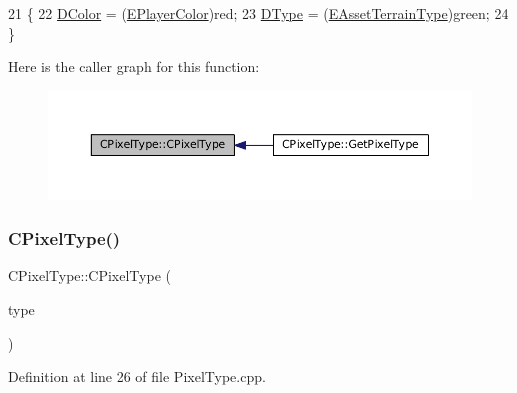 \begin{DoxyCode}
21                                                   \{
22     \hyperlink{classCPixelType_a474243cf748aee94cfa207659e940b6c}{DColor} = (\hyperlink{GameDataTypes_8h_aafb0ca75933357ff28a6d7efbdd7602f}{EPlayerColor})red;
23     \hyperlink{classCPixelType_aca37f042b510a349e0d3209c73ae51c5}{DType} = (\hyperlink{classCPixelType_af06457fd1c2ff34c67ce670e633a10b0}{EAssetTerrainType})green;
24 \}
\end{DoxyCode}
Here is the caller graph for this function\+:
\nopagebreak
\begin{figure}[H]
\begin{center}
\leavevmode
\includegraphics[width=350pt]{classCPixelType_a393381dca7114d6279bcee1e5f280e4b_icgraph}
\end{center}
\end{figure}
\hypertarget{classCPixelType_a8adc1d375b7d644025dcca8ff0849c76}{}\label{classCPixelType_a8adc1d375b7d644025dcca8ff0849c76} 
\subsubsection{\texorpdfstring{C\+Pixel\+Type()}{CPixelType()}\hspace{0.1cm}{\footnotesize\ttfamily [2/4]}}
{\footnotesize\ttfamily C\+Pixel\+Type\+::\+C\+Pixel\+Type (\begin{DoxyParamCaption}\item[{\hyperlink{classCTerrainMap_aff2ab991e237269941416dd79d8871d4}{C\+Terrain\+Map\+::\+E\+Tile\+Type}}]{type }\end{DoxyParamCaption})}



Definition at line 26 of file Pixel\+Type.\+cpp.


